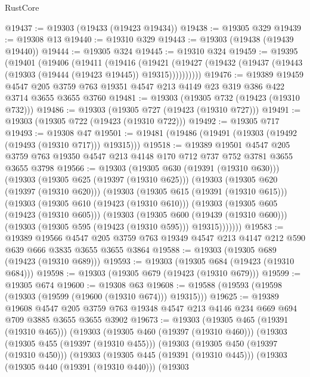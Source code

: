 \begin{lexlean}{RustCore}
\begin{coremodule}
@19437 := @19303 (@19433 (@19423 @19434))
@19438 := @19305 @329
@19439 := @19308 @13
@19440 := @19310 @329
@19443 := @19303 (@19438 (@19439 @19440))
@19444 := @19305 @324
@19445 := @19310 @324
@19459 := @19395
    (@19401
      (@19406
        (@19411
          (@19416
            (@19421
              (@19427 (@19432 (@19437 (@19443 (@19303 (@19444 (@19423 @19445)) @19315))))))))))
@19476 := @19389
    @19459
    @4547
    @205
    @3759
    @763
    @19351
    @4547
    @213
    @4149
    @23
    @319
    @386
    @422
    @3714
    @3655
    @3655
    @3760
@19481 := @19303 (@19305 @732 (@19423 (@19310 @732)))
@19486 := @19303 (@19305 @727 (@19423 (@19310 @727)))
@19491 := @19303 (@19305 @722 (@19423 (@19310 @722)))
@19492 := @19305 @717
@19493 := @19308 @47
@19501 := @19481 (@19486 (@19491 (@19303 (@19492 (@19493 (@19310 @717))) @19315)))
@19518 := @19389
    @19501
    @4547
    @205
    @3759
    @763
    @19350
    @4547
    @213
    @4148
    @170
    @712
    @737
    @752
    @3781
    @3655
    @3655
    @3798
@19566 := @19303
    (@19305 @630 (@19391 (@19310 @630)))
    (@19303
      (@19305 @625 (@19397 (@19310 @625)))
      (@19303
        (@19305 @620 (@19397 (@19310 @620)))
        (@19303
          (@19305 @615 (@19391 (@19310 @615)))
          (@19303
            (@19305 @610 (@19423 (@19310 @610)))
            (@19303
              (@19305 @605 (@19423 (@19310 @605)))
              (@19303
                (@19305 @600 (@19439 (@19310 @600)))
                (@19303 (@19305 @595 (@19423 (@19310 @595))) @19315)))))))
@19583 := @19389
    @19566
    @4547
    @205
    @3759
    @763
    @19349
    @4547
    @213
    @4147
    @212
    @590
    @639
    @666
    @3835
    @3655
    @3655
    @3864
@19588 := @19303 (@19305 @689 (@19423 (@19310 @689)))
@19593 := @19303 (@19305 @684 (@19423 (@19310 @684)))
@19598 := @19303 (@19305 @679 (@19423 (@19310 @679)))
@19599 := @19305 @674
@19600 := @19308 @63
@19608 := @19588 (@19593 (@19598 (@19303 (@19599 (@19600 (@19310 @674))) @19315)))
@19625 := @19389
    @19608
    @4547
    @205
    @3759
    @763
    @19348
    @4547
    @213
    @4146
    @234
    @669
    @694
    @709
    @3885
    @3655
    @3655
    @3902
@19673 := @19303
    (@19305 @465 (@19391 (@19310 @465)))
    (@19303
      (@19305 @460 (@19397 (@19310 @460)))
      (@19303
        (@19305 @455 (@19397 (@19310 @455)))
        (@19303
          (@19305 @450 (@19397 (@19310 @450)))
          (@19303
            (@19305 @445 (@19391 (@19310 @445)))
            (@19303
              (@19305 @440 (@19391 (@19310 @440)))
              (@19303

\end{coremodule}
\end{lexlean}

